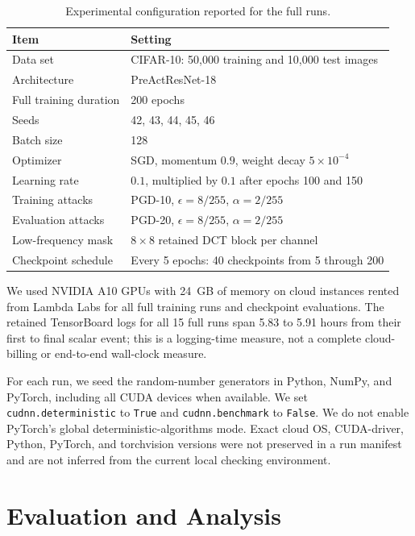 \documentclass{article}
\begin{document}
\begin{table}[t]
\centering
\caption{Experimental configuration reported for the full runs.}
\label{tab:configuration}
\begin{tabularx}{\linewidth}{@{}lX@{}}
\toprule
Item & Setting \\
\midrule
Data set & CIFAR-10: 50,000 training and 10,000 test images \\
Architecture & PreActResNet-18 \\
Full training duration & 200 epochs \\
Seeds & 42, 43, 44, 45, 46 \\
Batch size & 128 \\
Optimizer & SGD, momentum $0.9$, weight decay $5\times10^{-4}$ \\
Learning rate & $0.1$, multiplied by $0.1$ after epochs 100 and 150 \\
Training attacks & PGD-10, $\epsilon=8/255$, $\alpha=2/255$ \\
Evaluation attacks & PGD-20, $\epsilon=8/255$, $\alpha=2/255$ \\
Low-frequency mask & $8\times8$ retained DCT block per channel \\
Checkpoint schedule & Every 5 epochs: 40 checkpoints from 5 through 200 \\
\bottomrule
\end{tabularx}
\end{table}

We used NVIDIA A10 GPUs with 24~GB of memory on cloud instances rented from
Lambda Labs for all full training runs and checkpoint evaluations. The retained TensorBoard logs for all 15 full runs
span 5.83 to 5.91 hours from their first to final scalar event; this is a
logging-time measure, not a complete cloud-billing or end-to-end wall-clock
measure.

For each run, we seed the random-number generators in Python, NumPy, and
PyTorch, including all CUDA devices when available. We set
\texttt{cudnn.deterministic} to \texttt{True} and \texttt{cudnn.benchmark}
to \texttt{False}. We do not enable PyTorch's global
deterministic-algorithms mode. Exact cloud OS, CUDA-driver, Python, PyTorch,
and torchvision versions were not preserved in a run manifest and are not
inferred from the current local checking environment.

\section{Evaluation and Analysis}
\label{sec:analysis-plan}
\end{document}
